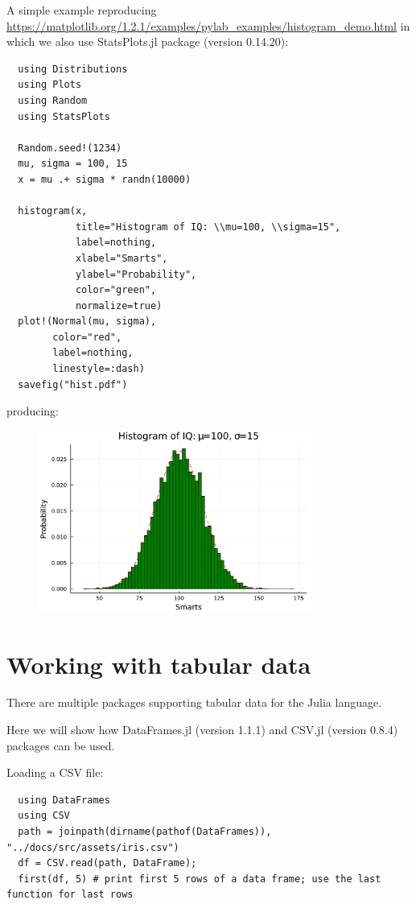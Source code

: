 \documentclass[10pt,a4paper]{article}
\begin{document}
A simple example reproducing \url{https://matplotlib.org/1.2.1/examples/pylab_examples/histogram_demo.html}
in which we also use StatsPlots.jl package (version 0.14.20):
\begin{lstlisting}
  using Distributions
  using Plots
  using Random
  using StatsPlots

  Random.seed!(1234)
  mu, sigma = 100, 15
  x = mu .+ sigma * randn(10000)

  histogram(x,
            title="Histogram of IQ: \\mu=100, \\sigma=15",
            label=nothing,
            xlabel="Smarts",
            ylabel="Probability",
            color="green",
            normalize=true)
  plot!(Normal(mu, sigma),
        color="red",
        label=nothing,
        linestyle=:dash)
  savefig("hist.pdf")
\end{lstlisting}

producing:
\begin{figure}[h]
\centering
\includegraphics[width=9cm]{hist.pdf}
\end{figure}

\section{Working with tabular data}

There are multiple packages supporting tabular data for the Julia language.

Here we will show how DataFrames.jl (version 1.1.1)
and CSV.jl (version 0.8.4) packages can be used.

Loading a CSV file:
\begin{lstlisting}
  using DataFrames
  using CSV
  path = joinpath(dirname(pathof(DataFrames)), "../docs/src/assets/iris.csv")
  df = CSV.read(path, DataFrame);
  first(df, 5) # print first 5 rows of a data frame; use the last function for last rows
\end{lstlisting}
\end{document}
